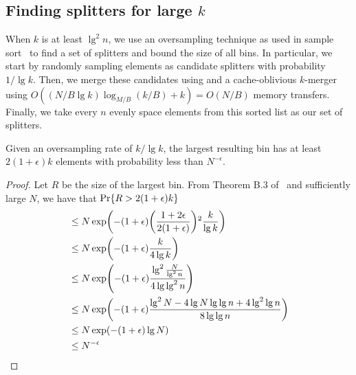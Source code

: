 \subsection*{Finding splitters for large $k$}

When $k$ is at least $\lg ^2 n$, we use an oversampling technique as used in 
sample sort~\cite{BlellochLeMa91} to find a set of splitters and bound the 
size of all bins.  In particular, we start by randomly sampling elements as 
candidate splitters with probability $1/\lg k$.  Then, we merge these candidates
using and a cache-oblivious $k$-merger~\cite{FrigoLePr99} using 
$O((N/B\lg k) \log_{M/B} (k/B) + k) = O(N/B)$ memory transfers.  Finally, we take
every $n$ evenly space elements from this sorted list as our set of splitters.

\begin{theorem}
  Given an oversampling rate of $k/\lg k$, the largest resulting bin has at least 
  $2(1+\epsilon)k$ elements with probability less than $N^{-\epsilon}$.
\end{theorem}
\begin{proof}
  Let $R$ be the size of the largest bin.  
  From Theorem B.3 of~\cite{BlellochLeMa91} and sufficiently large $N$, 
  we have that $\Pr\mathopen{}\left\{ R > 2(1+\epsilon)k \right\}\mathclose{}$
  \begin{align*}
    &\leq N \exp \mathopen{}\left( -(1+\epsilon)\mathopen{}\left(\frac{1+2\epsilon}{2(1+\epsilon)}\right)\mathclose{}^2 \frac{k}{\lg k} \right)\mathclose{}\\
    &\leq N \exp \mathopen{}\left(-(1+\epsilon)\frac{k}{4\lg k}\right)\mathclose{}\\
    &\leq N \exp \mathopen{}\left(-(1+\epsilon)\frac{\lg^2 \frac{N}{\lg^2 n}}{4 \lg \lg ^2 n}\right)\mathclose{}\\
    &\leq N \exp \mathopen{}\left(-(1+\epsilon)\frac{\lg^2 N - 4 \lg N \lg \lg n + 4\lg ^2 \lg n }{8 \lg \lg n}\right)\mathclose{}\\
    &\leq N \exp \mathopen{}\left(-(1+\epsilon)\lg N\right)\mathclose{}\\
    &\leq N^{-\epsilon}\\
  \end{align*}
\end{proof}



